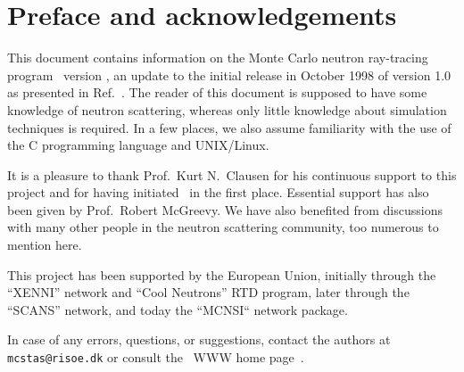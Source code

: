 
\chapter*{Preface and acknowledgements}
This document contains information on the Monte Carlo neutron
ray-tracing program \MCS\ version \version, an update to the initial
release in October 1998 of version 1.0 as presented in Ref.~\cite{nn_10_20}. The reader of this
document is supposed to have some knowledge of neutron scattering,
whereas only little knowledge about simulation techniques is
required. In a few places, we also assume familiarity with the
use of the C programming language and UNIX/Linux.

It is a pleasure to thank Prof.~Kurt N.~Clausen for his continuous
support to this project and for having initiated \MCS\ in the first
place. Essential support has also been given by Prof.~Robert McGreevy.
We have also benefited
from discussions with many other people in the neutron scattering
community, too numerous to mention here.


This project has been supported by the European Union, initially
through the ``XENNI'' network and ``Cool Neutrons'' RTD program, later
through the ``SCANS'' network, and today the ``MCNSI`` network package.

In case of any errors, questions, or suggestions, %
contact the authors at \verb+mcstas@risoe.dk+
or consult the \MCS\ WWW home page~\cite{mcstas_webpage}.

